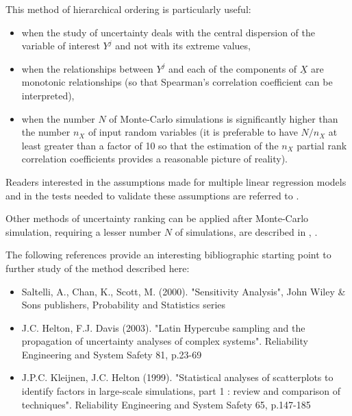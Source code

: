 {
  This method of hierarchical ordering is particularly useful:
  \begin{itemize}
  \item when the study of uncertainty deals with the central dispersion of the variable of interest $Y^j$ and not with its extreme values,
  \item when the relationships between $Y^j$ and each of the components of $\underline{X}$ are monotonic relationships (so that Spearman's correlation coefficient can be interpreted),
  \item when the number $N$ of Monte-Carlo simulations is significantly higher than the number $n_X$ of input random variables (it is preferable to have $N/n_X$ at least greater than a factor of 10 so that the estimation of the $n_X$ partial rank correlation coefficients provides a reasonable picture of reality).
  \end{itemize}

  Readers interested in the assumptions made for multiple linear regression models and in the tests needed to validate these assumptions are referred to .

  Other methods of uncertainty ranking can be applied after Monte-Carlo simulation, requiring a lesser number $N$ of simulations, are described in , .

  The following references provide an interesting bibliographic starting point to further study of the method described here:
  \begin{itemize}
  \item Saltelli, A., Chan, K., Scott, M. (2000). "Sensitivity Analysis", John Wiley \& Sons publishers, Probability and Statistics series
  \item J.C. Helton, F.J. Davis (2003). "Latin Hypercube sampling and the propagation of uncertainty analyses of complex systems". Reliability Engineering and System Safety 81, p.23-69
  \item J.P.C. Kleijnen, J.C. Helton (1999). "Statistical analyses of scatterplots to identify factors in large-scale simulations, part 1 : review and comparison of techniques". Reliability Engineering and System Safety 65, p.147-185
\end{itemize}}
